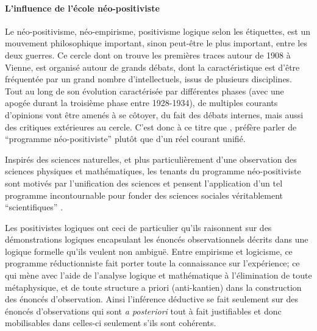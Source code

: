 
\paragraph{L'influence de l'école néo-positiviste}

Le néo-positivisme, néo-empirisme, positivisme logique selon les étiquettes, est un mouvement philosophique important, sinon peut-être le plus important, entre les deux guerres. Ce cercle dont on trouve les premières traces autour de 1908 à Vienne, est organisé autour de grands débats, dont la caractéristique est d'être fréquentée par un grand nombre d'intellectuels, issus de plusieurs disciplines. Tout au long de son évolution caractérisée par différentes phases (avec une apogée durant la troisième phase entre 1928-1934), de multiples courants d'opinions \textcite[126]{Ouelbani2006} vont être amenés à se côtoyer, du fait des débats internes, mais aussi des critiques extérieures au cercle. C'est donc à ce titre que \textcite[11]{Ouelbani2006}, préfère parler de \enquote{programme néo-positiviste}  plutôt que d'un réel courant unifié.

Inspirés des sciences naturelles, et plus particulièrement d'une observation des sciences physiques et mathématiques, les tenants du programme néo-positiviste sont motivés par l'unification des sciences et pensent l'application d'un tel programme incontournable pour fonder des sciences sociales véritablement \enquote{scientifiques} \autocite[1-20]{Ouelbani2006}.

Les positivistes logiques ont ceci de particulier qu'ils raisonnent sur des démonstrations logiques encapsulant les énoncés observationnels décrits dans une logique formelle qu'ils veulent non ambiguë. Entre empirisme et logicisme, ce programme réductionniste  fait porter toute la connaissance sur l'expérience; ce qui mène avec l'aide de l'analyse logique et mathématique à l'élimination de toute métaphysique, et de toute structure a priori (anti-kantien) dans la construction des énoncés d'observation. Ainsi l'inférence déductive se fait seulement sur des énoncés d'observations qui sont \textit{a posteriori} tout à fait justifiables et donc mobilisables dans celles-ci seulement s'ils sont cohérents.

